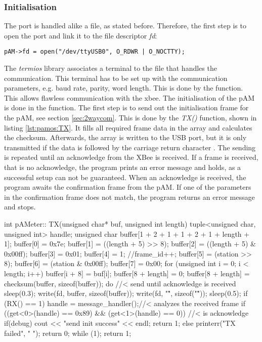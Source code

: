\subsubsection{Initialisation}
The port is handled alike a file, as stated before. Therefore, the first step is to open the port and link it to the file descriptor \textit{fd}:
\begin{lstlisting}[style=cpp]
pAM->fd = open("/dev/ttyUSB0", O_RDWR | O_NOCTTY);
\end{lstlisting}
The \textit{termios} library associates a terminal to the file that handles the communication. This terminal has to be set up with the communication parameters, e.g. baud rate, parity, word length. This is done by the  function. This allows flawless communication with the \acs{xbee}. The initialisation of the \ac{pAM} is done in the  function.
The first step is to send out the initialisation frame for the \ac{pAM}, see section \ref{sec:2waycom}. This is done by the \textit{TX()} function, shown in listing \ref{lst:pamos:TX}. It fills all required frame data in the  array and calculates the checksum.
Afterwards, the array is written to the USB port, but it is only transmitted if the data is followed by the carriage return character . The sending is repeated until an acknowledge from the XBee is received. If a frame is received, that is no acknowledge, the program prints an error message and holds, as a successful setup can not be guaranteed.
When an acknowledge is received, the program awaits the confirmation frame from the \ac{pAM}. If one of the parameters in the confirmation frame does not match, the program returns an error message and stops.
\begin{codecpp}[caption={\ac{cpp} function for transmitting data with an XBee module and checking if an acknowledge was received\label{lst:pamos:TX}.}]
int pAMeter:: TX(unsigned char* buf, unsigned int length)
{
	tuple<unsigned char, unsigned int> handle;
	unsigned char buffer[1 + 2 + 1 + 1 + 2 + 1 + length + 1];
	buffer[0] = 0x7e;
	buffer[1] = ((length + 5) >> 8);
	buffer[2] = ((length + 5) & 0x00ff);
	buffer[3] = 0x01;
	buffer[4] = 1; //frame_id++;
	buffer[5] = (station >> 8);
	buffer[6] = (station & 0x00ff); 
	buffer[7] = 0x00;
	for (unsigned int i = 0; i < length; i++) {
		buffer[i + 8] = buf[i];
	}
	buffer[8 + length] = 0;
	buffer[8 + length] = checksum(buffer, sizeof(buffer));
	do {//< send until acknowledge is received
		sleep(0.3);
		write(fd, buffer, sizeof(buffer));
		write(fd, "\r", sizeof("\r"));
		sleep(0.5);
		if (RX() == 1) {
			handle = message_handler();//< analyzes the received frame
			if ((get<0>(handle) == 0x89) && (get<1>(handle) == 0)) {
				//< is acknowledge
				if(debug) cout << "send init success" << endl;
				return 1;
			} else {
				printerr("TX failed", " ");
				return 0;
			}
		}
	} while (1);
	return 1;
}
\end{codecpp}
